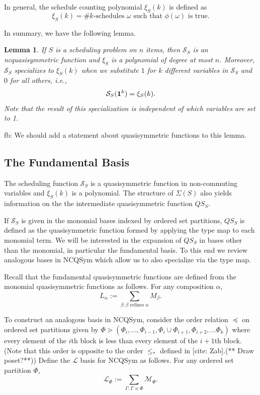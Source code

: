 \documentclass[12pt,reqno]{amsart}
\numberwithin{definition}{section}
\newtheorem{lemma}[definition]{Lemma}
\theoremstyle{definition}
\newcommand{\SSS}{\mathcal{S}}
\newcommand{\ncM}{\mathcal{M}}
\newcommand{\comment}[1]{\textsf{\footnotesize #1}}
\begin{document}
In general, the schedule counting polynomial $\xi_S(k)$ is defined as
\[
  \xi_S(k) = \# \text{$k$-schedules $\omega$ such that $\phi(\omega)$ is true}.
\]

In summary, we have the following lemma.

\begin{lemma}
If $S$ is a scheduling problem on $n$ items, then $\SSS_S$ is an ncquasisymmetric function and $\xi_S$ is a polynomial of degree at most $n$. Moreover, $\SSS_S$ specializes to $\xi_S(k)$ when we substitute $1$ for $k$ different variables in $\SSS_S$ and $0$ for all others, i.e.,
\[
  \SSS_S({\bf 1}^k) = \xi_S(k).
\]
Note that the result of this specialization is independent of which variables are set to 1.
\end{lemma}

\comment{fb: We should add a statement about quasisymmetric functions to this lemma.}

\subsection{The Fundamental Basis}

The scheduling function $\SSS_S$ is a quasisymmetric function in
non-commuting variables and $\xi_S(k)$ is a polynomial.  The structure
of $\Sigma(S)$ also yields information on the the intermediate
quasisymmetric function $QS_S$.

  If $\SSS_S$ is given in the monomial
bases indexed by ordered set partitions, $QS_S$ is defined as the
quasisymmetric function formed by applying the type map to each
monomial term.  We will be interested in the expansion of $QS_S$ in
bases other than the monomial, in particular the fundamental basis.
To this end we review analogous bases in NCQSym which allow us to also
specialize via the type map.


Recall that the fundamental quasisymmetric functions are defined from the monomial quasisymmetric functions as follows.  For any composition $\alpha$, 
$$L_{\alpha} := \sum_{\beta:\beta \textrm{ refines } \alpha} M_{\beta}.$$

To construct an analogous basis in NCQSym, consider the order relation $\preceq$ on ordered set partitions given by $\Phi \gtrdot (\Phi_i, \ldots,\Phi_{i-1}, \Phi_i \cup \Phi_{i+1}, \Phi_{i+2}, \ldots \Phi_k)$ where every element of the $i$th block is less than every element of the $i+1$th block. 
(Note that this order is opposite to the order $\leq_*$ defined in [cite: Zab].(** Draw poset?**))  Define the $\mathcal{L}$ basis for NCQSym as follows. For any ordered set partition $\Phi$,
$$\mathcal{L}_{\Phi} := \sum_{\Gamma:\Gamma \preceq \Phi} \ncM_{\Phi}.$$
\end{document}
